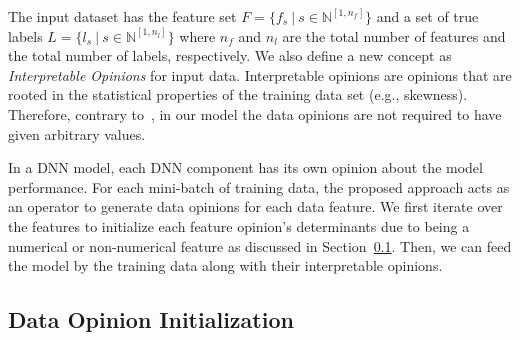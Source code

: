 The input dataset has the feature set $F=\{ f_s\ |\ s \in \mathbb{N}^{[1,n_f]}\}$ and a set of true labels $L=\{ l_s\ |\ s \in \mathbb{N}^{[1,n_l]} \}$ where $n_f$ and $n_l$ are the total number of features and the total number of labels, respectively.
We also define a new concept as \emph{Interpretable Opinions} for input data. Interpretable opinions are opinions that are rooted in the statistical properties of the training data set (e.g., skewness). Therefore, contrary to~\cite{hope}, in our model the data opinions are not required to have given arbitrary values. 

{\color{blue} In a DNN model, each DNN component has its own opinion about the model performance. For each mini-batch of training data, the proposed approach acts as an operator to generate data opinions for each data feature. We first iterate over the features to initialize each feature opinion's determinants due to being a numerical or non-numerical feature as discussed in Section~\ref{op_init_sec}. Then, we can feed the model by the training data along with their interpretable opinions.
}  

\subsection{Data Opinion Initialization}
\label{op_init_sec}


